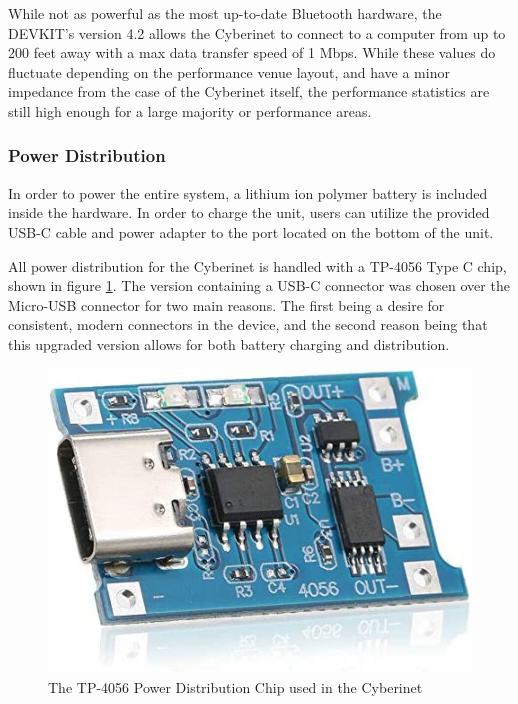 While not as powerful as the most up-to-date Bluetooth hardware, the DEVKIT's version 4.2 allows the Cyberinet to connect to a computer from up to 200 feet away with a max data transfer speed of 1 Mbps. While these values do fluctuate depending on the performance venue layout, and have a minor impedance from the case of the Cyberinet itself, the performance statistics are still high enough for a large majority or performance areas.

\subsubsection{Power Distribution}
In order to power the entire system, a lithium ion polymer battery is included inside the hardware. In order to charge the unit, users can utilize the provided USB-C cable and power adapter to the port located on the bottom of the unit. %


All power distribution for the Cyberinet is handled with a TP-4056 Type C chip, shown in figure \ref{fig:tp5046}. The version containing a USB-C connector was chosen over the Micro-USB connector for two main reasons. The first being a desire for consistent, modern connectors in the device, and the second reason being that this upgraded version allows for both battery charging and distribution. 

\begin{center}
    \begin{figure}
        \centering
        \includegraphics[scale=0.5]{diagrams/oem/4056.jpg}
        \caption{The TP-4056 Power Distribution Chip used in the Cyberinet}
        \label{fig:tp5046}
    \end{figure}
\end{center}

